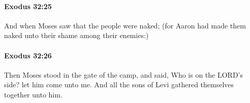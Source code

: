 		\paragraph{Exodus 32:25} %
			\label{EXODUS-32-25}

			And when Moses saw that the people were naked; (for Aaron had made them naked unto their shame among their enemies:)


		\paragraph{Exodus 32:26} %
			\label{EXODUS-32-26}

			Then Moses stood in the gate of the camp, and said, Who is on the LORD's side? let him come unto me. And all the sons of Levi gathered themselves together unto him.


